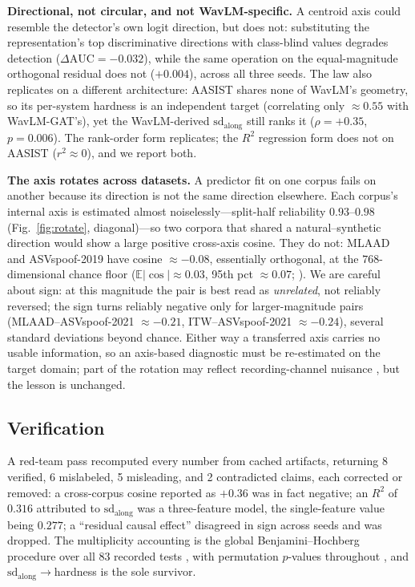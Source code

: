 \documentclass{article}
\begin{document}
\textbf{Directional, not circular, and not WavLM-specific.} A centroid axis could
resemble the detector's own logit direction, but does not: substituting the
representation's top discriminative directions with class-blind values degrades
detection ($\Delta\mathrm{AUC}=-0.032$), while the same operation on the
equal-magnitude orthogonal residual does not ($+0.004$), across all three seeds.
The law also replicates on a different architecture: AASIST shares none of WavLM's
geometry, so its per-system hardness is an independent target (correlating only
$\approx0.55$ with WavLM-GAT's), yet the WavLM-derived
$\mathrm{sd}_{\mathrm{along}}$ still ranks it ($\rho=+0.35$, $p=0.006$). The
rank-order form replicates; the $R^2$ regression form does not on AASIST
($r^2\approx0$), and we report both.

\textbf{The axis rotates across datasets.} A predictor fit on one corpus fails on
another because its direction is not the same direction elsewhere. Each corpus's
internal axis is estimated almost noiselessly---split-half reliability
$0.93$--$0.98$ (Fig.~\ref{fig:rotate}, diagonal)---so two corpora that shared a
natural--synthetic direction would show a large positive cross-axis cosine. They do
not: MLAAD and ASVspoof-2019 have cosine $\approx-0.08$, essentially orthogonal, at
the $768$-dimensional chance floor ($\mathbb{E}|\cos|\approx0.03$, 95th pct
$\approx0.07$; \citealp{vershynin2018hdp}). We are careful about sign: at this
magnitude the pair is best read as \emph{unrelated}, not reliably reversed; the
sign turns reliably negative only for larger-magnitude pairs
(MLAAD--ASVspoof-2021 $\approx-0.21$, ITW--ASVspoof-2021 $\approx-0.24$), several
standard deviations beyond chance. Either way a transferred axis carries no usable
information, so an axis-based diagnostic must be re-estimated on the target domain;
part of the rotation may reflect recording-channel nuisance
\citep{chen2021urchannel}, but the lesson is unchanged.

\subsection{Verification}
\label{sec:audit}
A red-team pass recomputed every number from cached artifacts, returning 8
verified, 6 mislabeled, 5 misleading, and 2 contradicted claims, each corrected or
removed: a cross-corpus cosine reported as $+0.36$ was in fact negative; an $R^2$ of
$0.316$ attributed to $\mathrm{sd}_{\mathrm{along}}$ was a three-feature model, the
single-feature value being $0.277$; a ``residual causal effect'' disagreed in sign
across seeds and was dropped. The multiplicity accounting is the global
Benjamini--Hochberg procedure over all 83 recorded tests
\citep{benjamini1995controlling}, with permutation $p$-values throughout
\citep{ojala2010permutation}, and $\mathrm{sd}_{\mathrm{along}}\!\to$hardness is the
sole survivor.
\end{document}
